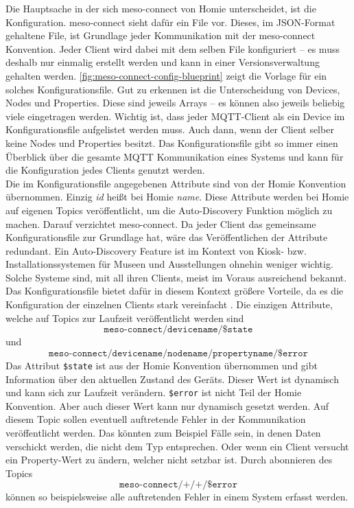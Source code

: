 Die Hauptsache in der sich meso-connect von Homie unterscheidet, ist die Konfiguration. meso-connect
sieht dafür ein File vor. Dieses, im JSON-Format gehaltene File, ist Grundlage jeder Kommunikation
mit der meso-connect Konvention. Jeder Client wird dabei mit dem selben File konfiguriert -- es muss 
deshalb nur einmalig erstellt werden und kann in einer Versionsverwaltung gehalten werden. 
\autoref{fig:meso-connect-config-blueprint} zeigt die Vorlage für ein solches Konfigurationsfile. 
Gut zu erkennen ist die Unterscheidung von Devices, Nodes und Properties. Diese sind jeweils Arrays --
es können also jeweils beliebig viele eingetragen werden. Wichtig ist, dass jeder MQTT-Client als ein
Device im Konfigurationsfile aufgelistet werden muss. Auch dann, wenn der Client selber 
keine Nodes und Properties besitzt. Das Konfigurationsfile gibt so immer einen Überblick über die 
gesamte MQTT Kommunikation eines Systems und kann für die Konfiguration jedes Clients genutzt werden.\\
Die im Konfigurationsfile angegebenen Attribute sind von der Homie Konvention übernommen. Einzig \emph{id} heißt
bei Homie \emph{name}. Diese Attribute werden bei Homie auf eigenen Topics veröffentlicht, um die 
Auto-Discovery Funktion möglich zu machen. Darauf verzichtet meso-connect. Da jeder Client das gemeinsame
Konfigurationsfile zur Grundlage hat, wäre das Veröffentlichen der Attribute redundant. Ein Auto-Discovery
Feature ist im Kontext von Kiosk- bzw. Installationssystemen für Museen und Ausstellungen ohnehin weniger wichtig.
Solche Systeme sind, mit all ihren Clients, meist im Voraus ausreichend bekannt. Das Konfigurationsfile
bietet dafür in diesem Kontext größere Vorteile, da es die Konfiguration der einzelnen Clients stark
vereinfacht . Die einzigen Attribute, welche auf Topics zur Laufzeit veröffentlicht 
werden sind
\[\texttt{meso-connect/devicename/\$state} \]
und\\
\[\texttt{meso-connect/devicename/nodename/propertyname/\$error} \]
Das Attribut \texttt{\$state} ist aus der Homie Konvention übernommen und gibt Information über den aktuellen
Zustand des Geräts. Dieser Wert ist dynamisch und kann sich zur Laufzeit verändern. \texttt{\$error} ist nicht 
Teil der Homie Konvention. Aber auch dieser Wert kann nur dynamisch gesetzt werden.
Auf diesem Topic sollen eventuell auftretende Fehler in der Kommunikation veröffentlicht
werden. Das könnten zum Beispiel Fälle sein, in denen Daten verschickt werden, die nicht dem Typ entsprechen.
Oder wenn ein Client versucht ein Property-Wert zu ändern, welcher nicht setzbar ist. Durch abonnieren 
des Topics
\[\texttt{meso-connect/+/+/\$error} \]
können so beispielsweise alle auftretenden Fehler in einem System erfasst werden.\\

